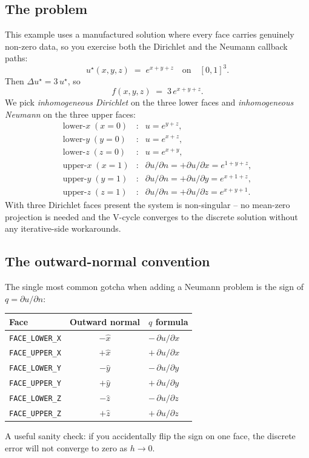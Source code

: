 \documentclass[11pt]{article}
\begin{document}
\subsection{The problem}

This example uses a manufactured solution where every face carries
genuinely non-zero data, so you exercise both the Dirichlet and the
Neumann callback paths:
\begin{equation}
  u^\star(x,y,z) \;=\; e^{x+y+z}
  \quad\text{on}\quad [0,1]^3.
  \label{eq:ex2-u}
\end{equation}
Then $\Delta u^\star = 3\,u^\star$, so
\begin{equation}
  f(x,y,z) \;=\; 3\,e^{x+y+z}.
  \label{eq:ex2-f}
\end{equation}
We pick \emph{inhomogeneous Dirichlet} on the three lower faces and
\emph{inhomogeneous Neumann} on the three upper faces:
\[
\begin{array}{lcl}
  \text{lower-}x\;(x=0) & : & u = e^{y+z}, \\
  \text{lower-}y\;(y=0) & : & u = e^{x+z}, \\
  \text{lower-}z\;(z=0) & : & u = e^{x+y}, \\
  \text{upper-}x\;(x=1) & : & \partial u / \partial n = +\partial u / \partial x = e^{1+y+z}, \\
  \text{upper-}y\;(y=1) & : & \partial u / \partial n = +\partial u / \partial y = e^{x+1+z}, \\
  \text{upper-}z\;(z=1) & : & \partial u / \partial n = +\partial u / \partial z = e^{x+y+1}.
\end{array}
\]
With three Dirichlet faces present the system is non-singular -- no
mean-zero projection is needed and the V-cycle converges to the
discrete solution without any iterative-side workarounds.

\subsection{The outward-normal convention}

The single most common gotcha when adding a Neumann problem is the
sign of $q = \partial u / \partial n$:
\begin{center}
\begin{tabular}{lcl}
\toprule
Face & Outward normal & $q$ formula \\
\midrule
\texttt{FACE\_LOWER\_X} & $-\hat{x}$ & $-\,\partial u/\partial x$ \\
\texttt{FACE\_UPPER\_X} & $+\hat{x}$ & $+\,\partial u/\partial x$ \\
\texttt{FACE\_LOWER\_Y} & $-\hat{y}$ & $-\,\partial u/\partial y$ \\
\texttt{FACE\_UPPER\_Y} & $+\hat{y}$ & $+\,\partial u/\partial y$ \\
\texttt{FACE\_LOWER\_Z} & $-\hat{z}$ & $-\,\partial u/\partial z$ \\
\texttt{FACE\_UPPER\_Z} & $+\hat{z}$ & $+\,\partial u/\partial z$ \\
\bottomrule
\end{tabular}
\end{center}
A useful sanity check: if you accidentally flip the sign on one face,
the discrete error will not converge to zero as $h \to 0$.
\end{document}

